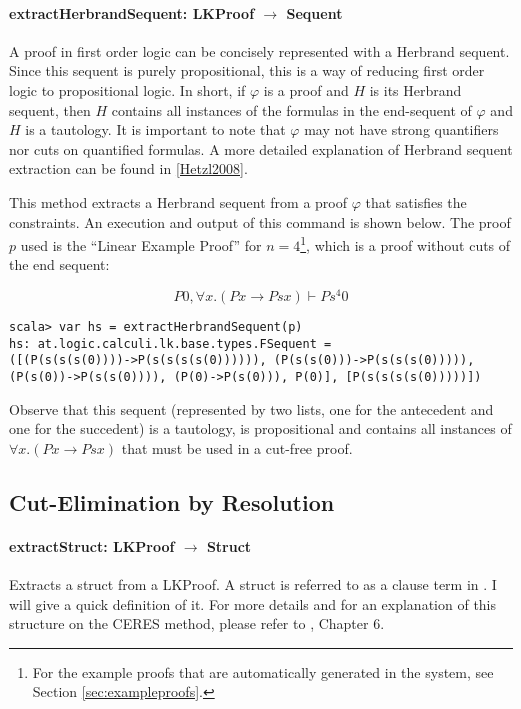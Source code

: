 \documentclass[a4paper, 11pt]{report}
\begin{document}
\paragraph{\textbf{extractHerbrandSequent: LKProof $\rightarrow$ Sequent}}

A proof in first order logic can be concisely represented with a Herbrand
sequent. Since this sequent is purely propositional, this is a way of reducing
first order logic to propositional logic. In short, if $\varphi$ is a proof and
$H$ is its Herbrand sequent, then $H$ contains all instances of the formulas in
the end-sequent of $\varphi$ and $H$ is a tautology. It is important to note
that $\varphi$ may not have strong quantifiers nor cuts on quantified formulas.
A more detailed explanation of Herbrand sequent extraction can be found in
\ref{Hetzl2008}. 

This method extracts a Herbrand sequent from a proof $\varphi$ that satisfies
the constraints. 
An execution and output of this command is shown below. The proof $p$ used is the
``Linear Example Proof'' for $n=4$\footnote{For the example proofs that are
automatically generated in the system, see Section \ref{sec:exampleproofs}.},
which is a proof without cuts of the end sequent:

$$P0, \forall x. (Px \rightarrow Psx) \vdash Ps^4 0$$

\begin{lstlisting}
scala> var hs = extractHerbrandSequent(p)
hs: at.logic.calculi.lk.base.types.FSequent =
([(P(s(s(s(0))))->P(s(s(s(s(0)))))), (P(s(s(0)))->P(s(s(s(0))))),
(P(s(0))->P(s(s(0)))), (P(0)->P(s(0))), P(0)], [P(s(s(s(s(0)))))])
\end{lstlisting}

Observe that this sequent (represented by two lists, one for the antecedent and
one for the succedent) is a tautology, is propositional and contains all
instances of $\forall x. (Px \rightarrow Psx)$ that must be used in a cut-free
proof.

\subsection{Cut-Elimination by Resolution}


\paragraph{\textbf{extractStruct: LKProof $\rightarrow$ Struct}}
Extracts a struct from a LKProof. A struct is referred to as a clause term in
\cite{Baaz2011}. I will give a quick definition of it. For more details and
for an explanation of this structure on the CERES method, please refer to
\cite{Baaz2011}, Chapter 6.
\end{document}
